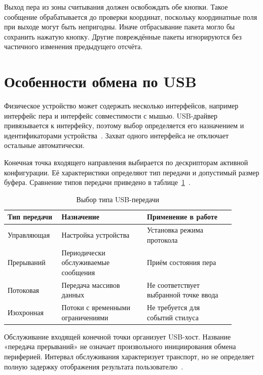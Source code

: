 Выход пера из зоны считывания должен освобождать обе кнопки. Такое сообщение обрабатывается до проверки координат, поскольку координатные поля при выходе могут быть непригодны. Иначе отбрасывание пакета могло бы сохранить нажатую кнопку. Другие повреждённые пакеты игнорируются без частичного изменения предыдущего отсчёта.

\section{Особенности обмена по USB}

Физическое устройство может содержать несколько интерфейсов, например интерфейс пера и интерфейс совместимости с мышью. USB-драйвер привязывается к интерфейсу, поэтому выбор определяется его назначением и идентификаторами устройства~\cite{kernelusb}. Захват одного интерфейса не отключает остальные автоматически.

Конечная точка входящего направления выбирается по дескрипторам активной конфигурации. Её характеристики определяют тип передачи и допустимый размер буфера. Сравнение типов передачи приведено в таблице~\ref{tbl:usb-transfer}~\cite{usb_spec}.

\begin{table}[htbp]
    \caption{Выбор типа USB-передачи}
    \label{tbl:usb-transfer}
    \centering
    \small
    \begin{tabular}{|p{0.20\linewidth}|p{0.34\linewidth}|p{0.35\linewidth}|}
        \hline
        Тип передачи & Назначение & Применение в работе \\ \hline
        Управляющая & Настройка устройства & Установка режима протокола \\ \hline
        Прерываний & Периодически обслуживаемые сообщения & Приём состояния пера \\ \hline
        Потоковая & Передача массивов данных & Не соответствует выбранной точке ввода \\ \hline
        Изохронная & Потоки с временными ограничениями & Не требуется для событий стилуса \\ \hline
    \end{tabular}
\end{table}

Обслуживание входящей конечной точки организует USB-хост. Название «передача прерываний» не означает произвольного инициирования обмена периферией. Интервал обслуживания характеризует транспорт, но не определяет полную задержку отображения результата пользователю~\cite{usb_spec}.

